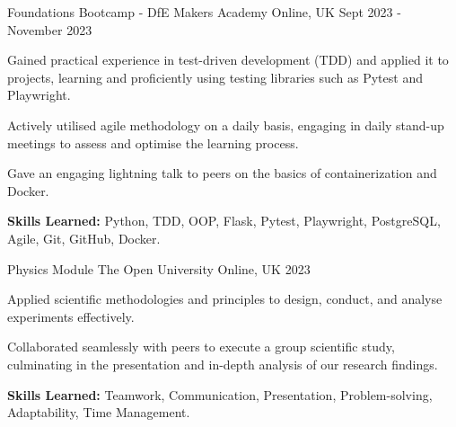 

\begin{cventries}

  \cventry
    {Foundations Bootcamp - DfE} %
    {Makers Academy} %
    {Online, UK} %
    {Sept 2023 - November 2023} %
    {
      \begin{cvitems} %
        \item {Gained practical experience in test-driven development (TDD) and applied it to projects, learning and proficiently using testing libraries such as Pytest and Playwright.}
        \item {Actively utilised agile methodology on a daily basis, engaging in daily stand-up meetings to assess and optimise the learning process.}
        \item {Gave an engaging lightning talk to peers on the basics of containerization and Docker.}
        \item {\textbf{Skills Learned:} Python, TDD, OOP, Flask, Pytest, Playwright, PostgreSQL, Agile, Git, GitHub, Docker.}
      \end{cvitems}
    }
      \cventry
    {{Physics Module}} %
    {The Open University} %
    {Online, UK} %
    {2023} %
    {
      \begin{cvitems} %
        \item {Applied scientific methodologies and principles to design, conduct, and analyse experiments
effectively.}
        \item {Collaborated seamlessly with peers to execute a group scientific study, culminating in the
presentation and in-depth analysis of our research findings.}
        \item {\textbf{Skills Learned:} Teamwork, Communication, Presentation, Problem-solving, Adaptability, Time Management.}
      \end{cvitems}
    }
\end{cventries}
